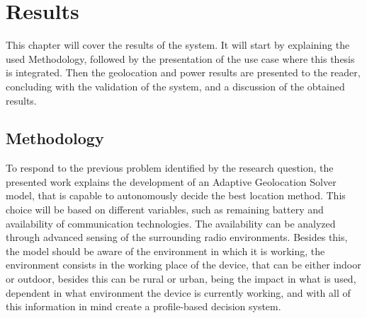 \chapter{Results}
\label{cha:Results}
This chapter will cover the results of the system.  It will start by explaining the used Methodology, followed by the presentation of the use case where this thesis is integrated.
Then the geolocation and power results are presented to the reader, concluding with the validation of the system, and a discussion of the obtained results.

\section{Methodology}
\label{sec:methodology}


To respond to the previous problem identified by the research question, the presented work explains the development of an Adaptive Geolocation Solver model, that is capable to autonomously decide the best location method. This choice will be based on different variables, such as remaining battery and availability of communication technologies. The availability can be analyzed through advanced sensing of the surrounding radio environments. Besides this, the model should be aware of the environment in which it is working, the environment consists in the working place of the device, that can be either indoor or outdoor, besides this can be rural or urban, being the impact in what is used, dependent in what environment the device is currently working, and with all of this information in mind create a profile-based decision system.

